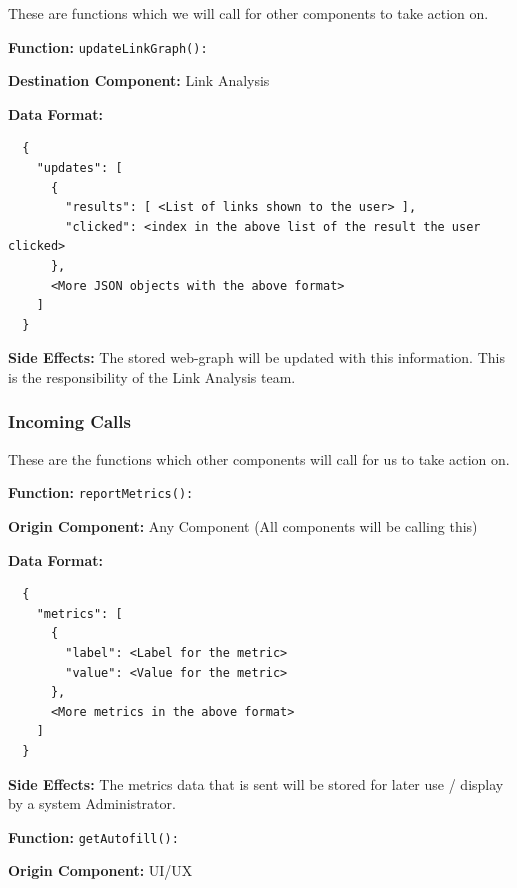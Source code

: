 These are functions which we will call for other components to take action on.

\medskip

\textbf{Function:} \verb|updateLinkGraph():|

\smallskip

\textbf{Destination Component:} Link Analysis

\smallskip

\textbf{Data Format:} \begin{verbatim}
  {
    "updates": [
      {
        "results": [ <List of links shown to the user> ],
        "clicked": <index in the above list of the result the user clicked>
      },
      <More JSON objects with the above format>
    ]
  }
\end{verbatim}

\smallskip

\textbf{Side Effects:} The stored web-graph will be updated with this information. This is the responsibility of the Link Analysis team.

\subsubsection*{Incoming Calls}
These are the functions which other components will call for us to take action on.

\medskip

\textbf{Function:} \verb|reportMetrics():|

\smallskip

\textbf{Origin Component:} Any Component (All components will be calling this)

\smallskip

\textbf{Data Format:} \begin{verbatim}
  {
    "metrics": [
      {
        "label": <Label for the metric>
        "value": <Value for the metric>
      },
      <More metrics in the above format>
    ]
  }
\end{verbatim}

\smallskip

\textbf{Side Effects:} The metrics data that is sent will be stored for later use / display by a system Administrator.

\bigskip

\textbf{Function:} \verb|getAutofill():|

\smallskip

\textbf{Origin Component:} UI/UX

\smallskip

